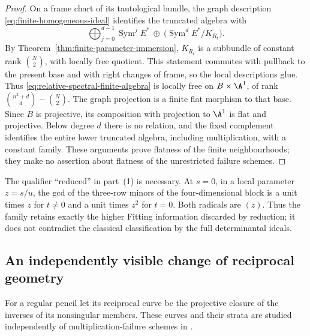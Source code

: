 \documentclass[11pt,reqno]{amsart}
\numberwithin{equation}{section}
\theoremstyle{definition}\newtheorem{definition}[theorem]{Definition}
\theoremstyle{remark}\newtheorem{remark}[theorem]{Remark}
\DeclareMathOperator{\Sym}{Sym}\DeclareMathOperator{\Gr}{Gr}
\begin{document}
\begin{proof}
On a frame chart of its tautological bundle, the graph description
\eqref{eq:finite-homogeneous-ideal} identifies the truncated algebra
with
\begin{equation}\label{eq:relative-spectral-finite-algebra}
 \bigoplus_{j=0}^{d-1}\Sym^j E^*
       \ \oplus\ \bigl(\Sym^d E^*/K_{R_t}\bigr).
\end{equation}
By Theorem~\ref{thm:finite-parameter-immersion}, \(K_{R_t}\)
is a subbundle of constant rank \(\binom N2\), with locally
free quotient.  This statement commutes with pullback to the present
base and with right changes of frame, so the local descriptions glue.
Thus \eqref{eq:relative-spectral-finite-algebra} is locally free
on \(B\times\A^1\), of rank
\(\binom{n^2+d}{d}-\binom N2\).  The graph projection is a
finite flat morphism to that base.  Since \(B\) is projective,
its composition with projection to \(\A^1\) is flat and
projective.  Below degree \(d\) there is no relation, and the
fixed complement identifies the entire lower truncated algebra,
including multiplication, with a constant family.  These arguments
prove flatness of the finite neighbourhoods; they make no assertion
about flatness of the unrestricted failure schemes.
\end{proof}

The qualifier ``reduced'' in part~(1) is necessary.  At \(s=0\),
in a local parameter \(z=s/u\), the gcd of the three-row minors of
the four-dimensional block is a unit times \(z\) for \(t\ne0\)
and a unit times \(z^2\) for \(t=0\).  Both radicals are
\((z)\).  Thus the family retains exactly the higher Fitting
information discarded by reduction; it does not contradict the
classical classification by the full determinantal ideals.

\subsection{An independently visible change of reciprocal geometry}

For a regular pencil let its reciprocal curve be the projective closure
of the inverses of its nonsingular members.  These curves and their
strata are studied independently of multiplication-failure schemes in
\cite[\S3]{FevolaMandelshtamSturmfels}.
\end{document}
